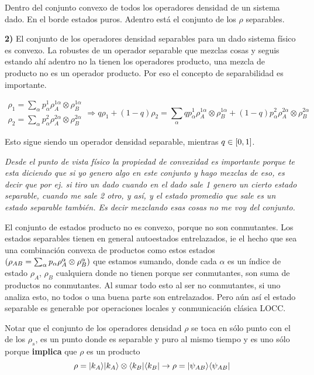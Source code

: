 Dentro del conjunto convexo de todos los operadores densidad de un
sistema dado. En el borde estados puros. Adentro está el conjunto
de los $\rho$ separables.

\textbf{2) }El conjunto de los operadores densidad separables para
un dado sistema físico es convexo. La robustes de un operador separable
que mezclas cosas y seguis estando ahí adentro no la tienen los operadores
producto, una mezcla de producto no es un operador producto. Por eso
el concepto de separabilidad es importante.

\[
\begin{array}{c}
\rho_{1}=\sum_{\alpha}p_{\alpha}^{1}\rho_{A}^{1\alpha}\otimes\rho_{B}^{1\alpha}\\
\rho_{2}=\sum_{\alpha}p_{\alpha}^{2}\rho_{A}^{2\alpha}\otimes\rho_{B}^{2\alpha}
\end{array}\Rightarrow q\rho_{1}+(1-q)\rho_{2}=\sum_{\alpha}qp_{\alpha}^{1}\rho_{A}^{1\alpha}\otimes\rho_{B}^{1\alpha}+(1-q)p_{\alpha}^{2}\rho_{A}^{2\alpha}\otimes\rho_{B}^{2\alpha}
\]

Esto sigue siendo un operador densidad separable, mientras $q\in\CORCHETES{0,1}$. 

\textit{Desde el punto de vista físico la propiedad de convexidad es importante
porque te esta diciendo que si yo genero algo en este conjunto y hago
mezclas de eso, es decir que por ej. si tiro un dado cuando en el
dado sale 1 genero un cierto estado separable, cuando me sale 2 otro,
y así, y el estado promedio que sale es un estado separable también.
Es decir mezclando esas cosas no me voy del conjunto. \\}

El conjunto de estados producto no es convexo, porque no son conmutantes.
Los estados separables tienen en general autoestados entrelazados,
ie el hecho que sea una combinación convexa de productos como estos
estados $\PARENTESIS{\rho_{AB}=\sum_{\alpha}p_{\alpha}\rho_{A}^{\alpha}\otimes\rho_{B}^{\alpha}}$
que estamos sumando, donde cada $\alpha$ es un índice de estado $\rho_{A}$,
$\rho_{B}$ cualquiera donde no tienen porque ser conmutantes, son
suma de productos no conmutantes. Al sumar todo esto al ser no conmutantes,
si uno analiza esto, no todos o una buena parte son entrelazados.
Pero aún así el estado separable es generable por operaciones locales
y conmunicación clásica LOCC. 

Notar que el conjunto de los operadores densidad $\rho$ se toca en
sólo punto con el de los $\rho_{s}$, es un punto donde es separable
y puro al mismo tiempo y es uno sólo porque \textbf{implica} que $\rho$
es un producto
\[
\rho=\KET{k_{A}}\KET{k_{A}}\otimes\BRA{k_{B}}\BRA{k_{B}}\rightarrow\rho=\KET{\psi_{AB}}\BRA{\psi_{AB}}
\]

